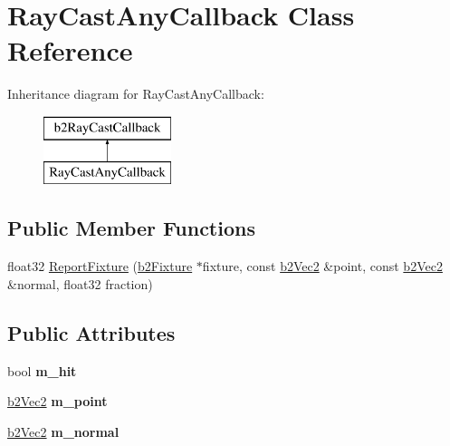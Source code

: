 \hypertarget{class_ray_cast_any_callback}{\section{Ray\-Cast\-Any\-Callback Class Reference}
\label{class_ray_cast_any_callback}
}
Inheritance diagram for Ray\-Cast\-Any\-Callback\-:\begin{figure}[H]
\begin{center}
\leavevmode
\includegraphics[height=2.000000cm]{class_ray_cast_any_callback}
\end{center}
\end{figure}
\subsection*{Public Member Functions}
\begin{DoxyCompactItemize}
\item 
float32 \hyperlink{class_ray_cast_any_callback_a27492b490537b0196e868670f986d1d3}{Report\-Fixture} (\hyperlink{classb2_fixture}{b2\-Fixture} $\ast$fixture, const \hyperlink{structb2_vec2}{b2\-Vec2} \&point, const \hyperlink{structb2_vec2}{b2\-Vec2} \&normal, float32 fraction)
\end{DoxyCompactItemize}
\subsection*{Public Attributes}
\begin{DoxyCompactItemize}
\item 
\hypertarget{class_ray_cast_any_callback_a25ecb156d955f6cc54cf35d5f705bf38}{bool {\bfseries m\-\_\-hit}}\label{class_ray_cast_any_callback_a25ecb156d955f6cc54cf35d5f705bf38}

\item 
\hypertarget{class_ray_cast_any_callback_a983e3b8036ca5727514e5e95229f12f2}{\hyperlink{structb2_vec2}{b2\-Vec2} {\bfseries m\-\_\-point}}\label{class_ray_cast_any_callback_a983e3b8036ca5727514e5e95229f12f2}

\item 
\hypertarget{class_ray_cast_any_callback_adcf5bde1bd5de121f6ed5d0b4f7aa20d}{\hyperlink{structb2_vec2}{b2\-Vec2} {\bfseries m\-\_\-normal}}\label{class_ray_cast_any_callback_adcf5bde1bd5de121f6ed5d0b4f7aa20d}

\end{DoxyCompactItemize}


